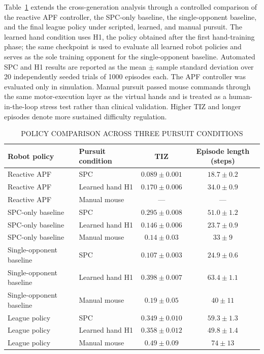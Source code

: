 \documentclass[journal,twoside,web]{ieeecolor2}
\begin{document}
Table~\ref{tab:policy-comparison} extends the cross-generation analysis through a controlled comparison of the reactive APF controller, the SPC-only baseline, the single-opponent baseline, and the final league policy under scripted, learned, and manual pursuit. The learned hand condition uses H1, the policy obtained after the first hand-training phase; the same checkpoint is used to evaluate all learned robot policies and serves as the sole training opponent for the single-opponent baseline. Automated SPC and H1 results are reported as the mean $\pm$ sample standard deviation over 20 independently seeded trials of 1000 episodes each. The APF controller was evaluated only in simulation. Manual pursuit passed mouse commands through the same motor-execution layer as the virtual hands and is treated as a human-in-the-loop stress test rather than clinical validation. Higher TIZ and longer episodes denote more sustained difficulty regulation.

\begin{table}[!t]
\caption{POLICY COMPARISON ACROSS THREE PURSUIT CONDITIONS}
\label{tab:policy-comparison}
\centering
\footnotesize
\setlength{\tabcolsep}{5pt}
\renewcommand{\arraystretch}{1.08}
\begin{tabularx}{\textwidth}{@{}>{\raggedright\arraybackslash}X >{\raggedright\arraybackslash}X c c@{}}
\toprule
Robot policy & Pursuit condition & TIZ & Episode length (steps) \\
\midrule
Reactive APF & SPC & $0.089 \pm 0.001$ & $18.7 \pm 0.2$ \\
Reactive APF & Learned hand H1 & $0.170 \pm 0.006$ & $34.0 \pm 0.9$ \\
Reactive APF & Manual mouse & --- & --- \\
SPC-only baseline & SPC & $0.295 \pm 0.008$ & $51.0 \pm 1.2$ \\
SPC-only baseline & Learned hand H1 & $0.146 \pm 0.006$ & $23.7 \pm 0.9$ \\
SPC-only baseline & Manual mouse & $0.14 \pm 0.03$ & $33 \pm 9$ \\
Single-opponent baseline & SPC & $0.107 \pm 0.003$ & $24.9 \pm 0.6$ \\
Single-opponent baseline & Learned hand H1 & $0.398 \pm 0.007$ & $63.4 \pm 1.1$ \\
Single-opponent baseline & Manual mouse & $0.19 \pm 0.05$ & $40 \pm 11$ \\
League policy & SPC & $0.349 \pm 0.010$ & $59.3 \pm 1.3$ \\
League policy & Learned hand H1 & $0.358 \pm 0.012$ & $49.8 \pm 1.4$ \\
League policy & Manual mouse & $0.49 \pm 0.09$ & $74 \pm 13$ \\
\bottomrule
\end{tabularx}
\end{table}
\end{document}

